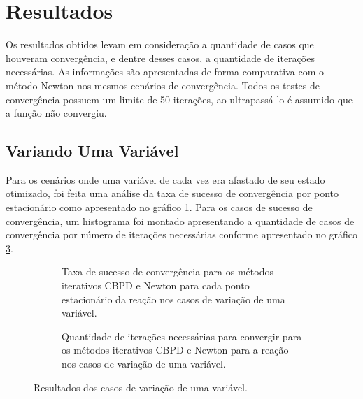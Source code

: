 \section{Resultados}

Os resultados obtidos levam em consideração a quantidade de casos que houveram convergência, e dentre desses casos, a quantidade de iterações necessárias. As informações são apresentadas de forma comparativa com o método Newton nos mesmos cenários de convergência. Todos os testes de convergência possuem um limite de 50 iterações, ao ultrapassá-lo é assumido que a função não convergiu. 

\subsection{Variando Uma Variável}
\label{sec:res-one-var}

Para os cenários onde uma variável de cada vez era afastado de seu estado otimizado, foi feita uma análise da taxa de sucesso de convergência por ponto estacionário como apresentado no gráfico \ref{fig:result-one-var-conv-tax}. Para os casos de sucesso de convergência, um histograma foi montado apresentando a quantidade de casos de convergência por número de iterações necessárias conforme apresentado no gráfico \ref{fig:result-one-var-conv-metric}.

\begin{figure}[h]
  \begin{subfigure}{.5\textwidth}
    \begin{center}
      
    \end{center}
    \caption{Taxa de sucesso de convergência para os métodos iterativos CBPD e Newton para cada ponto estacionário da reação  nos casos de variação de uma variável.}
    \label{fig:result-one-var-conv-tax}
  \end{subfigure}%
  \begin{subfigure}{.5\textwidth}
    \begin{center}
      
    \end{center}
    \caption{Quantidade de iterações necessárias para convergir para os métodos iterativos CBPD e Newton para a reação  nos casos de variação de uma variável.}
    \label{fig:result-one-var-conv-metric}
  \end{subfigure}
  \caption{Resultados dos casos de variação de uma variável.}
\end{figure}

